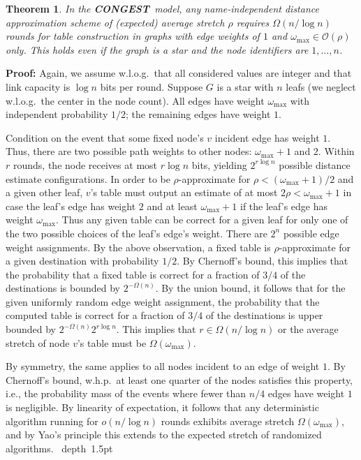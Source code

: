 \documentclass[letterpaper,11pt]{article}
\newtheorem{theorem}{Theorem}[section]
\newcommand{\blackslug}{\hbox{\hskip 1pt \vrule width 4pt height 8pt
depth 1.5pt \hskip 1pt}}
\newcommand{\QED}{\quad\blackslug\lower 8.5pt\null\par}
\newenvironment{proof}[1][Proof:]{\noindent \textbf{#1}\xspace}{\QED}
\newcommand{\BO}{\mathcal{O}}
\newcommand{\CONGEST}{\textbf{CONGEST}}
\begin{document}
\begin{theorem}\label{thm:lower_dist_independent}
In the \CONGEST\ model, any name-independent distance approximation scheme of
(expected) average stretch $\rho$ requires $\Omega(n/\log n)$ rounds for table
construction in graphs with edge weights of $1$ and $\omega_{\max}\in \BO(\rho)$
only. This holds even if the graph is a star and the node identifiers are
$1,\ldots,n$.
\end{theorem}
\begin{proof}
Again, we assume w.l.o.g.\ that all considered values are integer and that link
capacity is $\log n$ bits per round. Suppose $G$ is a star with $n$ leafs (we
neglect w.l.o.g.\ the center in the node count). All edges have weight
$\omega_{\max}$ with independent probability $1/2$; the remaining edges have
weight $1$.

Condition on the event that some fixed node's $v$ incident edge has weight $1$.
Thus, there are two possible path weights to other nodes: $\omega_{\max}+1$ and
$2$. Within $r$ rounds, the node receives at most $r\log n$ bits, yielding
$2^{r\log n}$ possible distance estimate configurations. In order to be
$\rho$-approximate for $\rho<(\omega_{\max}+1)/2$ and a given other leaf, $v$'s
table must output an estimate of at most $2\rho<\omega_{\max}+1$ in case the
leaf's edge has weight $2$ and at least $\omega_{\max}+1$ if the leaf's edge has
weight $\omega_{\max}$. Thus any given table can be correct for a given leaf for
only one of the two possible choices of the leaf's edge's weight. There are
$2^n$ possible edge weight assignments. By the above
observation, a fixed table is $\rho$-approximate for a given destination with
probability $1/2$. By Chernoff's bound, this implies that the probability that a
fixed table is correct for a fraction of $3/4$ of the destinations is bounded by
$2^{-\Omega(n)}$. By the union bound, it follows that for the given uniformly
random edge weight assignment, the probability that the computed table is
correct for a fraction of $3/4$ of the destinations is upper bounded by
$2^{-\Omega(n)}2^{r\log n}$. This implies that $r\in \Omega(n/\log n)$ or the
average stretch of node $v$'s table must be $\Omega(\omega_{\max})$.

By symmetry, the same applies to all nodes incident to an edge of weight $1$. By
Chernoff's bound, w.h.p.\ at least one quarter of the nodes satisfies this
property, i.e., the probability mass of the events where fewer than $n/4$ edges
have weight $1$ is negligible. By linearity of expectation, it follows that any
deterministic algorithm running for $o(n/\log n)$ rounds exhibits average
stretch $\Omega(\omega_{\max})$, and by Yao's principle this extends to the
expected stretch of randomized algorithms.
\end{proof}
\end{document}

